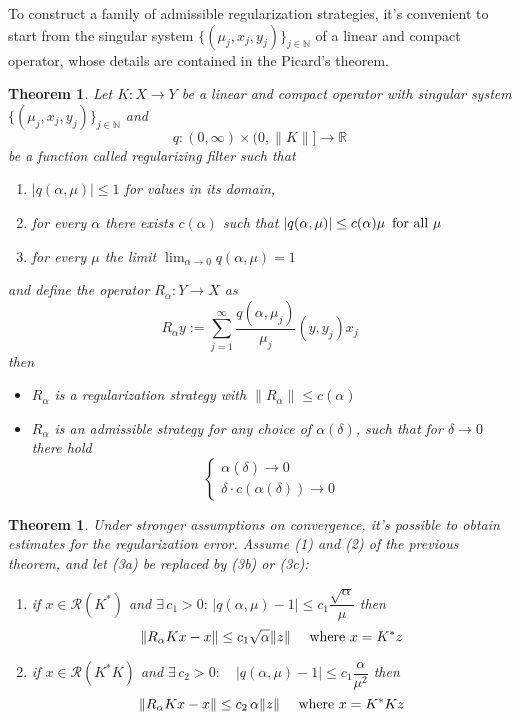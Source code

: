 \documentclass[10pt, a4paper, twoside, openright]{book}
\theoremstyle{definition}
\theoremstyle{plain}
\newtheorem{theorem}[subsection]{Theorem}
\theoremstyle{plain}
\theoremstyle{plain}
\theoremstyle{plain}
\theoremstyle{plain}
\theoremstyle{plain}
\theoremstyle{plain}
\theoremstyle{plain}
\begin{document}
To construct a family of admissible regularization strategies, it's convenient to start from the singular system $\{(\mu_j, x_j, y_j)\}_{j\in\mathbb{N}}$ of a linear and compact operator, whose details are contained in the Picard's theorem.
\begin{theorem}
 Let $K:X\to Y$ be a linear and compact operator with singular system $\{(\mu_j, x_j, y_j)\}_{j\in\mathbb{N}}$ and
 \begin{equation}
  q:(0, \infty)\times(0, \|K\|]\to \mathbb{R}
 \end{equation}
 be a function called \emph{regularizing filter} such that
 \begin{enumerate}
  \item $|q(\alpha,\mu)|\leq 1$ for values in its domain,
  \item for every $\alpha$ there exists $c(\alpha)$ such that $ |q(\alpha, \mu)| \leq c(\alpha)\mu\,\textup{ for all }\mu$    
  \item[3a.] for every $\mu$ the limit $ \lim_{\alpha\to0}q(\alpha,\mu) = 1$   
 \end{enumerate}
 and define the operator $R_\alpha:Y\to X$ as
 \begin{equation}
  R_\alpha y:=\sum_{j=1}^\infty \dfrac{q(\alpha,\mu_j)}{\mu_j}(y, y_j)x_j
 \end{equation}
 then
 \begin{itemize}
  \item $R_\alpha$ is a regularization strategy with $\|R_\alpha\|\leq c(\alpha)$
  \item $R_\alpha$ is an admissible strategy for any choice of $\alpha(\delta)$, such that for $\delta\to 0$ there hold
  \begin{equation}
   \left\{
   \begin{aligned}
    \alpha(\delta) \to 0\\
    \delta \cdot c(\alpha(\delta)) \to 0
   \end{aligned}
   \right.
  \end{equation}
 \end{itemize}
\end{theorem}
\begin{theorem}
 Under stronger assumptions on convergence, it's possible to obtain estimates for the regularization error.
 Assume (1) and (2) of the previous theorem, and let (3a) be replaced by (3b) or (3c):
 \begin{enumerate}
  \item[3b.] if $x\in\mathcal{R}(K^*)$ and $\exists\, c_1>0:\, |q(\alpha,\mu) - 1|\leq c_1\dfrac{\sqrt{\alpha}}{\mu}$
  then
  \begin{equation}
   \|R_\alpha Kx - x\|\leq c_1\sqrt{\alpha}\|z\|\quad \textup{ where }x=K^*z
  \end{equation}
  \item[3c.] if $x\in\mathcal{R}(K^*K)$ and $\exists\, c_2>0:\quad |q(\alpha,\mu) - 1|\leq c_1\dfrac{\alpha}{\mu^2}$
  then
  \begin{equation}
   \|R_\alpha Kx - x\|\leq c_2\,\alpha\|z\|\quad \textup{ where }x=K^*Kz
  \end{equation}
 \end{enumerate}
\end{theorem}
\end{document}
